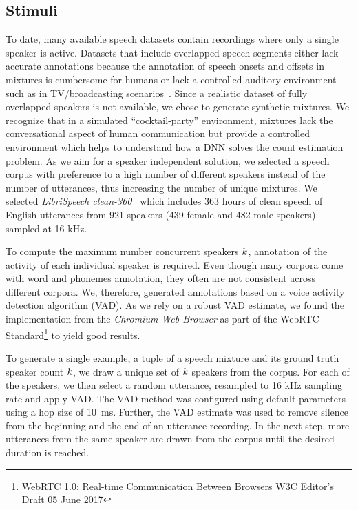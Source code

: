 \subsection{Stimuli}
To date, many available speech datasets contain recordings where only a single speaker is active.
Datasets that include overlapped speech segments either lack accurate annotations because the annotation of speech onsets and offsets in mixtures is cumbersome for humans or lack a controlled auditory environment such as in TV/broadcasting scenarios~\cite{Gravier12}.
Since a realistic dataset of fully overlapped speakers is not available, we chose to generate synthetic mixtures.
We recognize that in a simulated ``cocktail-party'' environment, mixtures lack the conversational aspect of human communication but provide a controlled environment which helps to understand how a DNN solves the count estimation problem.
As we aim for a speaker independent solution, we selected a speech corpus with preference to a high number of different speakers instead of the number of utterances, thus increasing the number of unique mixtures.
We selected \emph{LibriSpeech clean-360}~\cite{panayotov15} which includes 363 hours of clean speech of English utterances from 921 speakers (439 female and 482 male speakers) sampled at 16 kHz.
\par
To compute the maximum number concurrent speakers \(k\), annotation of the activity of each individual speaker is required.
Even though many corpora come with word and phonemes annotation, they often are not consistent across different corpora.
We, therefore, generated annotations based on a voice activity detection algorithm (VAD). As we rely on a robust VAD estimate, we found the implementation from the \emph{Chromium Web Browser} as part of the WebRTC Standard\footnote{WebRTC 1.0: Real-time Communication Between Browsers W3C Editor's Draft 05 June 2017} to yield good results.
\par
To generate a single example, a tuple of a speech mixture and its ground truth speaker count \(k \), we draw a unique set of \(k \) speakers from the corpus.
For each of the speakers, we then select a random utterance, resampled to 16 kHz sampling rate and apply VAD.\@
The VAD method was configured using default parameters using a hop size of 10~ms.
Further, the VAD estimate was used to remove silence from the beginning and the end of an utterance recording.
In the next step, more utterances from the same speaker are drawn from the corpus until the desired duration is reached.
